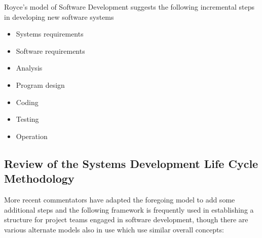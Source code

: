 \documentclass[a4paper,12pt]{article}
\begin{document}
\begin{samepage}
Royce's model of Software Development suggests the following incremental steps in developing new software systems
\begin{itemize}
\item Systems requirements
\item Software requirements
\item Analysis
\item Program design
\item Coding
\item Testing
\item Operation
\end{itemize}
\subsection {Review of the Systems Development Life Cycle Methodology}
More recent commentators have adapted the foregoing model to add some additional steps and the following framework is frequently used in establishing a structure for project teams engaged in software development, though there are various alternate models also in use which use  similar overall concepts:


\end{samepage}
\end{document}
